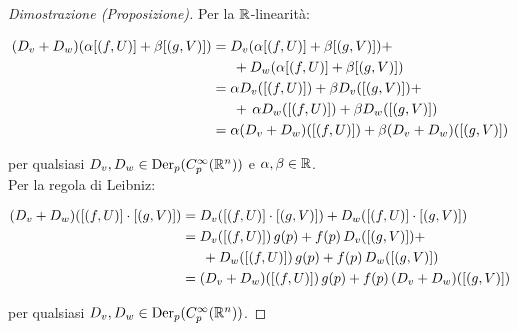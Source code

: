 \begin{proof}[Dimostrazione (Proposizione)]
	Per la $ \mathbb{R} $-linearità:
	
	\begin{align}
		\begin{split}
			(D_{v} + D_{w}) (\alpha [(f,U)] + \beta [(g,V)]) &= D_{v} (\alpha [(f,U)] + \beta [(g,V)]) + \\
			& \hspace{15px} + D_{w} (\alpha [(f,U)] + \beta [(g,V)]) \\
			&= \alpha D_{v} ([(f,U)]) + \beta D_{v} ([(g,V)]) + \\
			& \hspace{15px} + \,\alpha D_{w} ([(f,U)]) + \beta D_{w} ([(g,V)]) \\
			&= \alpha (D_{v} + D_{w}) ([(f,U)]) + \beta (D_{v} + D_{w}) ([(g,V)])
		\end{split}
	\end{align}

	per qualsiasi $ D_{v}, D_{w} \in \operatorname{Der}_{p}(C_{p}^{\infty}(\mathbb{R}^{n})) $ e $ \alpha,\beta \in \mathbb{R} $. \\
	Per la regola di Leibniz:
	
	\begin{align}
		\begin{split}
			(D_{v} + D_{w}) ([(f,U)] \cdot [(g,V)]) &= D_{v} ([(f,U)] \cdot [(g,V)]) + D_{w} ([(f,U)] \cdot [(g,V)]) \\
			&= D_{v} ([(f,U)]) \, g(p) + f(p) \, D_{v} ([(g,V)]) + \\
			& \hspace{15px} + D_{w} ([(f,U)]) \, g(p) + f(p) \, D_{w} ([(g,V)]) \\
			&= (D_{v} + D_{w}) ([(f,U)]) \, g(p) + f(p) \, (D_{v} + D_{w}) ([(g,V)])
		\end{split}
	\end{align}

	per qualsiasi $ D_{v}, D_{w} \in \operatorname{Der}_{p}(C_{p}^{\infty}(\mathbb{R}^{n})) $.
\end{proof}

